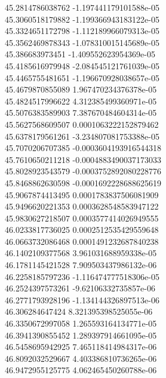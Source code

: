 {45.2814786038762 -1.197441179101588e-05 \\
45.3060518179882 -1.199366943183122e-05 \\
45.3324651172798 -1.112189966079313e-05 \\
45.3562469878343 -1.078310015145689e-05 \\
45.386683973451 -1.409552623954369e-05 \\
45.4185616979948 -2.084545121761039e-05 \\
45.4465755481651 -1.196670928038657e-05 \\
45.4679870855089 1.967470234376378e-05 \\
45.4824517996622 4.312385499360971e-05 \\
45.5076383589903 7.387670484604314e-05 \\
45.5627568609507 0.0001063222152879462 \\
45.6378179561261 -3.234807081753388e-05 \\
45.7070206707385 -0.0003604193916544318 \\
45.7610650211218 -0.0004883490037173033 \\
45.8028923543579 -0.0003752892080228776 \\
45.8468862630598 -0.0001692228688625619 \\
45.9067874413495 0.0001783837506081909 \\
45.9496620221353 0.0003628548583947122 \\
45.9830627218507 0.0003577414026949555 \\
46.0233817736025 0.0002512535429559648 \\
46.0663732086468 0.0001491232687840238 \\
46.1402109377568 3.961031688959338e-05 \\
46.1781145421528 7.909503437986132e-06 \\
46.2258185797236 -1.116474777518306e-05 \\
46.2524397573261 -9.62106332735857e-06 \\
46.2771793928196 -1.134144326897513e-06 \\
46.306284647424 8.321395398525055e-06 \\
46.3350672997058 1.265593164134771e-05 \\
46.3941390855452 1.289397914661095e-05 \\
46.5458695942925 7.465118414984317e-06 \\
46.8092032529667 4.403386810736265e-06 \\
46.9472955125775 4.062465450260788e-06 \\
}
